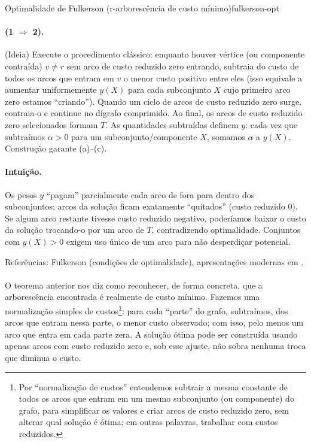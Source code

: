 \documentclass[12pt,a4paper]{article}
\def\emph#1{#1}%
\begin{document}
\begin{teobox}{Optimalidade de Fulkerson (r-arborescência de custo mínimo)}{fulkerson-opt}
    \paragraph{(1 $\Rightarrow$ 2).} (Ideia) Execute o procedimento clássico: enquanto houver vértice (ou componente contraída) $v\neq r$ sem arco de custo reduzido zero entrando, subtraia do custo de todos os arcos que entram em $v$ o menor custo positivo entre eles (isso equivale a aumentar uniformemente $y(X)$ para cada subconjunto $X$ cujo primeiro arco zero estamos “criando”). Quando um ciclo de arcos de custo reduzido zero surge, contraia-o e continue no dígrafo comprimido. Ao final, os arcos de custo reduzido zero selecionados formam $T$. As quantidades subtraídas definem $y$: cada vez que subtraímos $\alpha>0$ para um subconjunto/componente $X$, somamos $\alpha$ a $y(X)$. Construção garante (a)–(c).

    \paragraph{Intuição.} Os pesos $y$ “pagam” parcialmente cada arco de fora para dentro dos subconjuntos; arcos da solução ficam exatamente “quitados” (custo reduzido 0). Se algum arco restante tivesse custo reduzido negativo, poderíamos baixar o custo da solução trocando-o por um arco de $T$, contradizendo optimalidade. Conjuntos com $y(X)>0$ exigem uso único de um arco para não desperdiçar potencial.

    \medskip
    \emph{Referências:} Fulkerson (condições de optimalidade), apresentações modernas em \cite{frank2014, schrijver2003comb}.
    \label{thm:fulkerson-optimalidade-arborescencia}
\end{teobox}

\paragraph{}
O teorema anterior nos diz como reconhecer, de forma concreta, que a arborescência encontrada é realmente de custo mínimo. Fazemos uma normalização simples de custos\footnote{Por “normalização de custos” entendemos subtrair a mesma constante de todos os arcos que entram em um mesmo subconjunto (ou componente) do grafo, para simplificar os valores e criar arcos de custo reduzido zero, sem alterar qual solução é ótima; em outras palavras, trabalhar com custos reduzidos.}: para cada “parte” do grafo, subtraímos, dos arcos que entram nessa parte, o menor custo observado; com isso, pelo menos um arco que entra em cada parte zera. A solução ótima pode ser construída usando apenas arcos com custo reduzido zero e, sob esse ajuste, não sobra nenhuma troca que diminua o custo.
\end{document}
